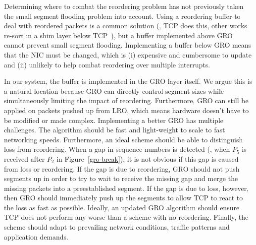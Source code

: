 Determining where to combat the reordering problem has not previously taken the small segment flooding problem into account.  Using a reordering buffer to deal with reordered packets is a common solution (\eg{}, TCP does this, other works re-sort in a shim layer below TCP~\cite{drb}), but a buffer implemented above GRO cannot prevent small segment flooding.  Implementing a buffer below GRO means that the NIC must be changed, which is (i) expensive and cumbersome to update and (ii) unlikely to help combat reordering over multiple interrupts.

In our system, the buffer is implemented in the GRO layer itself.  We argue this is a natural location because GRO can
directly control segment sizes while simultaneously limiting the impact of reordering. 
Furthermore, GRO can still be applied on packets pushed up from LRO, which means hardware doesn't have to be modified
or made complex.
Implementing a better GRO has multiple challenges. The algorithm should be fast and light-weight to scale to fast networking speeds. Furthermore, an ideal scheme should be able to distinguish loss from reordering.  When a gap in sequence numbers is detected (\eg{}, when $P_5$ is received after $P_2$ in Figure~\ref{gro-break}), it is not obvious if this gap is caused from loss or reordering.  If the gap is due to reordering, GRO should not push segments up in order to try to wait to receive the missing gap and merge the missing packets into a preestablished segment.  If the gap is due to loss, however, then GRO should immediately push up the segments to allow TCP to react to the loss as fast as possible. Ideally, an updated GRO algorithm should ensure TCP does not perform any worse than a scheme with no reordering. Finally, the scheme should adapt to prevailing network conditions, traffic patterns and application demands.



